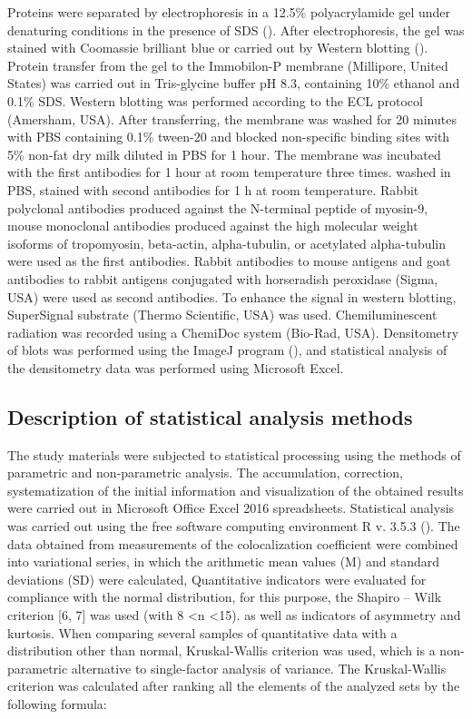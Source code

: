 \documentclass[english,authoryear]{elsarticle}
\begin{document}
Proteins were separated by electrophoresis in a 12.5\%  polyacrylamide gel under denaturing conditions in the presence of SDS (\cite{laemmli1970cleavage}).
After electrophoresis, the gel was stained with Coomassie brilliant blue or carried out by Western blotting (\cite{towbin1979electrophoretic}).
Protein transfer from the gel to the Immobilon-P membrane (Millipore, United States) was carried out in Tris-glycine buffer pH 8.3, containing 10\% ethanol and 0.1\% SDS.
Western blotting was performed according to the ECL protocol (Amersham, USA).
After transferring, the membrane was washed for 20 minutes with PBS containing 0.1\% tween-20 and blocked non-specific binding sites with 5\% non-fat dry milk diluted in PBS for 1 hour.
The membrane was incubated with the first antibodies for 1 hour at room temperature three times. washed in PBS, stained with second antibodies for 1 h at room temperature. Rabbit polyclonal antibodies produced against the N-terminal peptide of myosin-9, mouse monoclonal antibodies produced against the high molecular weight isoforms of tropomyosin, beta-actin, alpha-tubulin, or acetylated alpha-tubulin were used as the first antibodies.
Rabbit antibodies to mouse antigens and goat antibodies to rabbit antigens conjugated with horseradish peroxidase (Sigma, USA) were used as second antibodies.
To enhance the signal in western blotting, SuperSignal substrate (Thermo Scientific, USA) was used.
Chemiluminescent radiation was recorded using a ChemiDoc system (Bio-Rad, USA).
Densitometry of blots was performed using the ImageJ program (\cite{rueden2017imagej2}), and statistical analysis of the densitometry data was performed using Microsoft Excel.

\subsection{Description of statistical analysis methods}

The study materials were subjected to statistical processing using the methods of parametric and non-parametric analysis. The accumulation, correction, systematization of the initial information and visualization of the obtained results were carried out in Microsoft Office Excel 2016 spreadsheets.
Statistical analysis was carried out using the free software computing environment R v. 3.5.3 (\cite{team2014r}).
The data obtained from measurements of the colocalization coefficient were combined into variational series, in which the arithmetic mean values (M) and standard deviations (SD) were calculated,
Quantitative indicators were evaluated for compliance with the normal distribution, for this purpose, the Shapiro – Wilk criterion [6, 7] was used (with 8 <n <15).
as well as indicators of asymmetry and kurtosis.
When comparing several samples of quantitative data with a distribution other than normal, Kruskal-Wallis criterion was used, which is a non-parametric alternative to single-factor analysis of variance. The Kruskal-Wallis criterion was calculated after ranking all the elements of the analyzed sets by the following formula:
\end{document}
